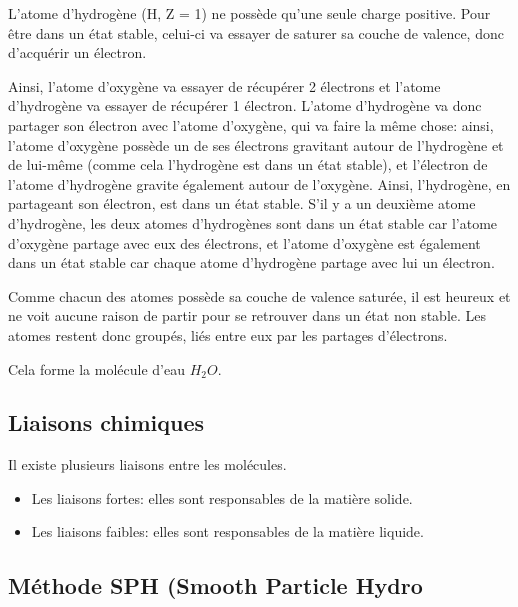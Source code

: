 \documentclass[
]{report}
\providecommand{\tightlist}{%
  \setlength{\itemsep}{0pt}\setlength{\parskip}{0pt}}\usepackage{longtable,booktabs,array}
\begin{document}
L'atome d'hydrogène (H, Z = 1) ne possède qu'une seule charge positive.
Pour être dans un état stable, celui-ci va essayer de saturer sa couche
de valence, donc d'acquérir un électron.

Ainsi, l'atome d'oxygène va essayer de récupérer 2 électrons et l'atome
d'hydrogène va essayer de récupérer 1 électron. L'atome d'hydrogène va
donc partager son électron avec l'atome d'oxygène, qui va faire la même
chose: ainsi, l'atome d'oxygène possède un de ses électrons gravitant
autour de l'hydrogène et de lui-même (comme cela l'hydrogène est dans un
état stable), et l'électron de l'atome d'hydrogène gravite également
autour de l'oxygène. Ainsi, l'hydrogène, en partageant son électron, est
dans un état stable. S'il y a un deuxième atome d'hydrogène, les deux
atomes d'hydrogènes sont dans un état stable car l'atome d'oxygène
partage avec eux des électrons, et l'atome d'oxygène est également dans
un état stable car chaque atome d'hydrogène partage avec lui un
électron.

Comme chacun des atomes possède sa couche de valence saturée, il est
heureux et ne voit aucune raison de partir pour se retrouver dans un
état non stable. Les atomes restent donc groupés, liés entre eux par les
partages d'électrons.

Cela forme la molécule d'eau \(H_{2}O\).

\subsection{Liaisons chimiques}\label{liaisons-chimiques}

Il existe plusieurs liaisons entre les molécules.

\begin{itemize}
\tightlist
\item
  Les liaisons fortes: elles sont responsables de la matière solide.
\item
  Les liaisons faibles: elles sont responsables de la matière liquide.
\end{itemize}

\subsection{Méthode SPH (Smooth Particle
Hydro}\label{muxe9thode-sph-smooth-particle-hydro}


\printbibliography
\end{document}
